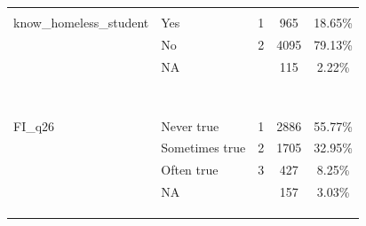 \documentclass[
  10pt,
]{article}
\begin{document}
\begin{longtable}[t]{llccc}
\cellcolor{gray!6}{} & \cellcolor{gray!6}{NA} & \cellcolor{gray!6}{} & \cellcolor{gray!6}{11} & \cellcolor{gray!6}{4.15\%}\\
know\_homeless\_student & Yes & 1 & 965 & 18.65\%\\
 & No & 2 & 4095 & 79.13\%\\
 & NA &  & 115 & \vphantom{1} 2.22\%\\
\cellcolor{gray!6}{federal\_student\_aid} & \cellcolor{gray!6}{Grants} & \cellcolor{gray!6}{1} & \cellcolor{gray!6}{1293} & \cellcolor{gray!6}{24.99\%}\\
\cellcolor{gray!6}{} & \cellcolor{gray!6}{Work Study} & \cellcolor{gray!6}{2} & \cellcolor{gray!6}{256} & \cellcolor{gray!6}{4.95\%}\\
\cellcolor{gray!6}{} & \cellcolor{gray!6}{Loans} & \cellcolor{gray!6}{3} & \cellcolor{gray!6}{581} & \cellcolor{gray!6}{11.23\%}\\
\cellcolor{gray!6}{} & \cellcolor{gray!6}{Scholarship} & \cellcolor{gray!6}{4} & \cellcolor{gray!6}{237} & \cellcolor{gray!6}{4.58\%}\\
\cellcolor{gray!6}{} & \cellcolor{gray!6}{Multiple Aids} & \cellcolor{gray!6}{5} & \cellcolor{gray!6}{1652} & \cellcolor{gray!6}{31.92\%}\\
\cellcolor{gray!6}{} & \cellcolor{gray!6}{Other} & \cellcolor{gray!6}{6} & \cellcolor{gray!6}{992} & \cellcolor{gray!6}{19.17\%}\\
\cellcolor{gray!6}{} & \cellcolor{gray!6}{None} & \cellcolor{gray!6}{7} & \cellcolor{gray!6}{49} & \cellcolor{gray!6}{0.95\%}\\
\cellcolor{gray!6}{} & \cellcolor{gray!6}{NA} & \cellcolor{gray!6}{} & \cellcolor{gray!6}{115} & \cellcolor{gray!6}{2.22\%}\\
FI\_q26 & Never true & 1 & 2886 & 55.77\%\\
 & Sometimes true & 2 & 1705 & 32.95\%\\
 & Often true & 3 & 427 & 8.25\%\\
 & NA &  & 157 & \vphantom{2} 3.03\%\\
\cellcolor{gray!6}{FI\_q27} & \cellcolor{gray!6}{Never true} & \cellcolor{gray!6}{1} & \cellcolor{gray!6}{2579} & \cellcolor{gray!6}{49.84\%}\\
\cellcolor{gray!6}{} & \cellcolor{gray!6}{Sometimes true} & \cellcolor{gray!6}{2} & \cellcolor{gray!6}{1744} & \cellcolor{gray!6}{33.70\%}\\
\cellcolor{gray!6}{} & \cellcolor{gray!6}{Often true} & \cellcolor{gray!6}{3} & \cellcolor{gray!6}{695} & \cellcolor{gray!6}{13.43\%}\\

\end{longtable}
\end{document}
